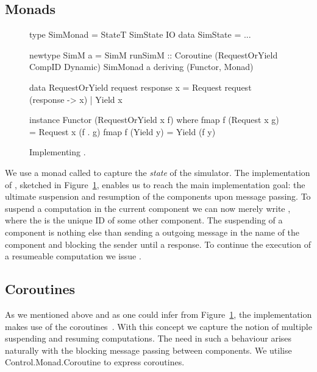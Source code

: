 \subsection{Monads}
\label{sec:impl-monads}
\begin{figure}
\begin{code}
type SimMonad  =  StateT SimState IO
data SimState  = ...

newtype SimM a
  = SimM { runSimM ::
               Coroutine
                 (RequestOrYield CompID Dynamic)
                 SimMonad
                 a
         }
    deriving (Functor, Monad)

data RequestOrYield request response x
  =  Request request (response -> x)
  |  Yield   x

instance Functor (RequestOrYield x f) where
  fmap f (Request x g)  = Request x (f . g)
  fmap f (Yield y)      = Yield (f y)
\end{code}
\caption{Implementing .}
\label{fig:code-simm}
\end{figure}

We use a monad called  to capture the \emph{state} of the simulator.
The implementation of \hspace{-1pt}, sketched in Figure~\ref{fig:code-simm}, enables us to reach the main implementation goal: the ultimate suspension and resumption of the components upon message passing.
To suspend a computation in the current component we can now merely write , where the  is the unique ID of some other component.
The suspending of a component is nothing else than sending a outgoing message in the name of the component and blocking the sender until a response.
To continue the execution of a resumeable computation we issue  \mbox{.} %


\subsection{Coroutines}
\label{sec:impl-coroutines}
As we mentioned above and as one could infer from Figure~\ref{fig:code-simm}, the implementation makes use of the coroutines~\cite{coroutines}.
With this concept we capture the notion of multiple suspending and resuming computations.
The need in such a behaviour arises naturally with the blocking message passing between components.
We utilise \textsf{Control.Monad.Coroutine} \cite{cmt} to express coroutines.

